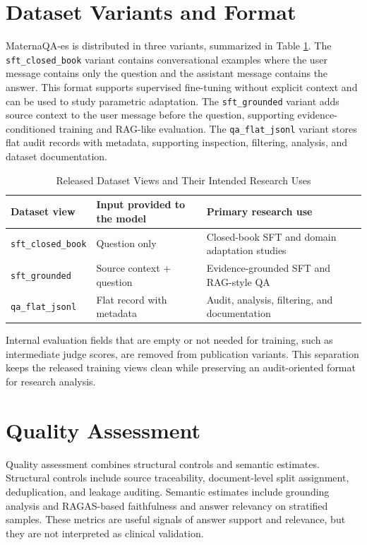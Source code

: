 \documentclass[conference]{IEEEtran}
\begin{document}
\section{Dataset Variants and Format}
MaternaQA-es is distributed in three variants, summarized in Table \ref{tab:variants}. The \texttt{sft\_closed\_book} variant contains conversational examples where the user message contains only the question and the assistant message contains the answer. This format supports supervised fine-tuning without explicit context and can be used to study parametric adaptation. The \texttt{sft\_grounded} variant adds source context to the user message before the question, supporting evidence-conditioned training and RAG-like evaluation. The \texttt{qa\_flat\_jsonl} variant stores flat audit records with metadata, supporting inspection, filtering, analysis, and dataset documentation.

\begin{table}[t]
\caption{Released Dataset Views and Their Intended Research Uses}
\label{tab:variants}
\centering
\scriptsize
\begin{tabular}{|p{}|p{}|p{}|}
\hline
\textbf{Dataset view} & \textbf{Input provided to the model} & \textbf{Primary research use} \\
\hline
\texttt{sft\_closed\_book} & Question only & Closed-book SFT and domain adaptation studies \\
\hline
\texttt{sft\_grounded} & Source context + question & Evidence-grounded SFT and RAG-style QA \\
\hline
\texttt{qa\_flat\_jsonl} & Flat record with metadata & Audit, analysis, filtering, and documentation \\
\hline
\end{tabular}
\end{table}

Internal evaluation fields that are empty or not needed for training, such as intermediate judge scores, are removed from publication variants. This separation keeps the released training views clean while preserving an audit-oriented format for research analysis.

\section{Quality Assessment}
Quality assessment combines structural controls and semantic estimates. Structural controls include source traceability, document-level split assignment, deduplication, and leakage auditing. Semantic estimates include grounding analysis and RAGAS-based faithfulness and answer relevancy on stratified samples. These metrics are useful signals of answer support and relevance, but they are not interpreted as clinical validation.
\end{document}
